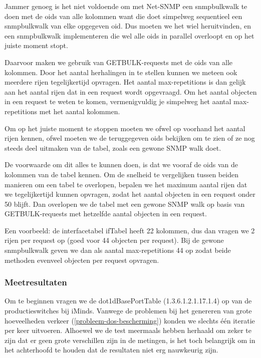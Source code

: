 Jammer genoeg is het niet voldoende om met Net-SNMP een snmpbulkwalk te doen met de \glspl{oid} van alle kolommen want
die doet simpelweg sequentieel een snmpbulkwalk van elke opgegeven \gls{oid}.
Dus moeten we het wiel heruitvinden, en een snmpbulkwalk implementeren die wel alle \glspl{oid} in parallel overloopt en op het juiste moment stopt.

Daarvoor maken we gebruik van GETBULK-requests met de \glspl{oid} van alle kolommen.
Door het aantal herhalingen in te stellen kunnen we meteen ook meerdere rijen tegelijkertijd opvragen.
Het aantal max-repetitions is dan gelijk aan het aantal rijen dat in een request wordt opgevraagd.
Om het aantal objecten in een request te weten te komen, vermenigvuldig je simpelweg het aantal max-repetitions met het aantal kolommen.

Om op het juiste moment te stoppen moeten we ofwel op voorhand het aantal rijen kennen, ofwel moeten we de teruggegeven \glspl{oid}
bekijken om te zien of ze nog steeds deel uitmaken van de tabel, zoals een gewone SNMP walk doet.

De voorwaarde om dit alles te kunnen doen, is dat we vooraf de \glspl{oid} van de kolommen van de tabel kennen.
Om de snelheid te vergelijken tussen beiden manieren om een tabel te overlopen,
bepalen we het maximum aantal rijen dat we tegelijkertijd kunnen opvragen, zodat het aantal objecten in een request onder 50 blijft.
Dan overlopen we de tabel met een gewone SNMP walk op basis van GETBULK-requests met hetzelfde aantal objecten in een request.

Een voorbeeld: de interfacetabel ifTabel heeft 22 kolommen, dus dan vragen we 2 rijen per request op (goed voor 44 objecten per request).
Bij de gewone snmpbulkwalk geven we dan als aantal max-repetitions 44 op zodat beide methoden evenveel objecten per request opvragen.

\subsubsection{Meetresultaten}

Om te beginnen vragen we de dot1dBasePortTable (1.3.6.1.2.1.17.1.4) op van de productieswitches bij iMinds.
Vanwege de problemen bij het genereren van grote hoeveelheden verkeer (\cref{probleem-dos-bescherming}) konden we slechts één iteratie per keer uitvoeren.
Alhoewel we de test meermaals hebben herhaald om zeker te zijn dat er geen grote verschillen zijn in de metingen,
is het toch belangrijk om in het achterhoofd te houden dat de resultaten niet erg nauwkeurig zijn.

